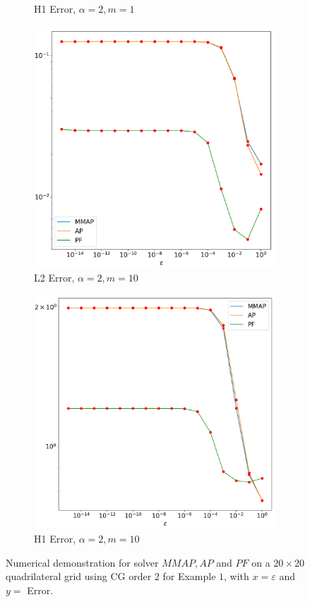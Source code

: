 \documentclass[12pt]{ociamthesis}
\begin{document}
\begin{figure}[H]
\begin{subfigure}{0.44\textwidth}
     \caption{H1 Error, $\alpha=2, m=1$}
 \end{subfigure}
 \begin{subfigure}{0.44\textwidth}
     \includegraphics[width=\textwidth]{Pics/LHSims/E1c_MMAP_AP_PFL2.png}
     \caption{L2 Error, $\alpha=2, m=10$} \label{E1_Strong_Ans}
 \end{subfigure}
 \hfill
 \begin{subfigure}{0.44\textwidth}
     \includegraphics[width=\textwidth]{Pics/LHSims/E1c_MMAP_AP_PFH1.png}
     \caption{H1 Error, $\alpha=2, m=10$}
 \end{subfigure}
 \caption{Numerical demonstration for solver $MMAP, AP$ and $PF$ on a $20\times 20$ quadrilateral grid using CG order $2$ for Example $1$, with $x=\varepsilon$ and $y=$ Error.} \label{E1_LH_PF}
\end{figure}
\end{document}
